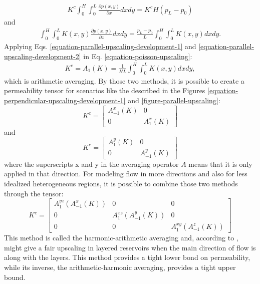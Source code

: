 %
\begin{align}
	\label{equation-parallel-upscaling-development-1}
	K^c\int_{0}^{H}\int_{0}^{L}\frac{\partial p(x,y)}{\partial x}dx dy=K^cH(p_L-p_0)
\end{align}
%
and
%
\begin{align}
	\label{equation-parallel-upscaling-development-2}
	\int_{0}^{H}\int_{0}^{L}K(x,y)\frac{\partial p(x,y)}{\partial x}dx dy=\frac{p_L-p_0}{L}\int_{0}^{H}\int_{0}^{L}K(x,y)dx dy.
\end{align}
%
Applying Eqs. \ref{equation-parallel-upscaling-development-1} and \ref{equation-parallel-upscaling-development-2} in Eq. \ref{equation-poisson-upscaling}:
%
%
\begin{align}
	K^c=A_1(K)=\frac{1}{HL}\int_{0}^{H}\int_{0}^{L}K(x,y)dx dy,
\end{align}
%
which is arithmetic averaging. 
%
By those two methods, it is possible to create a permeability tensor for scenarios like the described in the Figures \ref{equation-perpendicular-upscaling-development-1} and \ref{figure-parallel-upscaling}:
\begin{equation}
	K^c=
	\begin{bmatrix}
		A^x_{-1}(K)	&0\\
		0	&A^x_{1}(K)
	\end{bmatrix}
\end{equation}
%
and
%
\begin{equation}
	K^c=
	\begin{bmatrix}
		A^y_{1}(K)	&0\\
		0	&A^y_{-1}(K)
	\end{bmatrix}
\end{equation}
%
where the superscripts x and y in the averaging operator $A$ means that it is only applied in that direction. 
%
For modeling flow in more directions and also for less idealized heterogeneous regions, it is possible to combine those two methods through the tensor:
%
\begin{equation}
	\label{equation-arithmetic-harmonic-averaging}
	K^c=
	\begin{bmatrix}
		A^{yz}_{1}(A^{x}_{-1}(K))	&0	&0\\
		0	&A^{xz}_{1}(A^{y}_{-1}(K))	&0\\
		0	&0	&A^{xy}_{1}(A^{z}_{-1}(K))
	\end{bmatrix}
\end{equation}
%
This method is called the harmonic-arithmetic averaging and, according to \cite{Lie2015}, might give a fair upscaling in layered reservoirs when the main direction of flow is along with the layers. 
%
This method provides a tight lower bond on permeability, while its inverse, the arithmetic-harmonic averaging, provides a tight upper bound.
